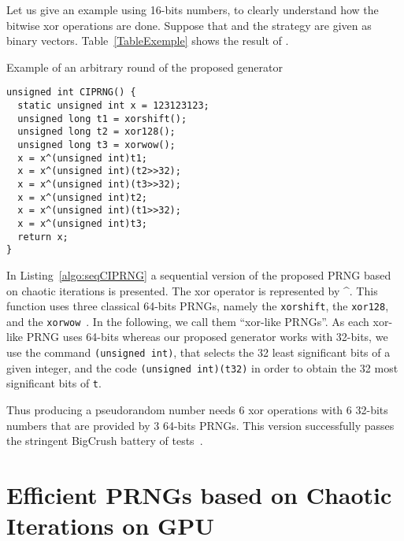 \documentclass{article}
\begin{document}
Let us give an example using 16-bits numbers, to clearly understand how the bitwise xor operations
are
done.  
Suppose  that  and the  strategy  are given as
binary vectors.
Table~\ref{TableExemple} shows the result of .

\begin{table}

\caption{Example of an arbitrary round of the proposed generator}
\label{TableExemple}
\end{table}




\begin{lstlisting}
unsigned int CIPRNG() {
  static unsigned int x = 123123123;
  unsigned long t1 = xorshift();
  unsigned long t2 = xor128();
  unsigned long t3 = xorwow();
  x = x^(unsigned int)t1;
  x = x^(unsigned int)(t2>>32);
  x = x^(unsigned int)(t3>>32);
  x = x^(unsigned int)t2;
  x = x^(unsigned int)(t1>>32);
  x = x^(unsigned int)t3;
  return x;
}
\end{lstlisting}




In Listing~\ref{algo:seqCIPRNG} a sequential  version of the proposed PRNG based
on  chaotic  iterations  is  presented.   The xor  operator  is  represented  by
\textasciicircum.  This function uses  three classical 64-bits PRNGs, namely the
\texttt{xorshift},         the          \texttt{xor128},         and         the
\texttt{xorwow}~\cite{Marsaglia2003}.  In the following, we call them ``xor-like
PRNGs''.   As each  xor-like PRNG  uses 64-bits  whereas our  proposed generator
works with 32-bits, we use the command \texttt{(unsigned int)}, that selects the
32 least  significant bits  of a given  integer, and the  code \texttt{(unsigned
  int)(t32)} in order to obtain the 32 most significant bits of \texttt{t}.

Thus producing a pseudorandom number needs 6 xor operations with 6 32-bits numbers
that  are provided by  3 64-bits  PRNGs.  This  version successfully  passes the
stringent BigCrush battery of tests~\cite{LEcuyerS07}.

\section{Efficient PRNGs based on Chaotic Iterations on GPU}
\label{sec:efficient PRNG gpu}
\end{document}
